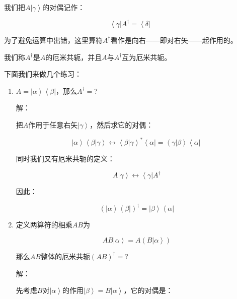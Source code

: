 我们把$A \left| \gamma \right\rangle$的对偶记作：

\begin{equation}
\left\langle \gamma \right| A^\dagger = \left\langle \delta \right|~
\end{equation}

为了避免运算中出错，这里算符$A^\dagger$看作是向右——即对右矢——起作用的。

我们称$A^\dagger $是$A$的厄米共轭，并且$A$与$A^\dagger $互为厄米共轭。

下面我们来做几个练习：

\begin{enumerate}
\item 

$A = \left| \alpha \right\rangle \left\langle \beta \right|$，那么$A^\dagger = ?$

解：

把$A$作用于任意右矢$\left| \gamma \right\rangle$，然后求它的对偶：

\begin{equation}
\left| \alpha \right\rangle \left\langle \beta | \gamma \right\rangle \leftrightarrow \left\langle \beta | \gamma \right\rangle^* \left\langle \alpha \right| = \left\langle \gamma | \beta \right\rangle \left\langle \alpha \right|~
\end{equation}

同时我们又有厄米共轭的定义：

\begin{equation*}
A \left| \gamma \right\rangle \leftrightarrow \left\langle \gamma \right|   A^\dagger
\end{equation*}

因此：

\begin{equation}
\left(  \left| \alpha \right\rangle \left\langle \beta \right|  \right)^\dagger = \left| \beta \right\rangle \left\langle \alpha \right|
\end{equation}


\item

定义两算符的相乘$AB $为

\begin{equation}
AB \left| \alpha \right\rangle = A \left( B \left| \alpha \right\rangle  \right)
\end{equation}

那么$AB$整体的厄米共轭$(AB)^\dagger = ?$

解：

先考虑$B$对$\left| \alpha \right\rangle$的作用$\left| \beta \right\rangle =  B \left| \alpha \right\rangle$，它的对偶是：


\end{enumerate}
